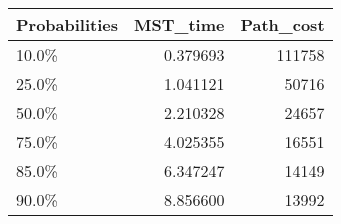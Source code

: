 \begin{tabular}{lrr}
\toprule
Probabilities &  MST\_time &  Path\_cost \\
\midrule
        10.0\% &  0.379693 &     111758 \\
        25.0\% &  1.041121 &      50716 \\
        50.0\% &  2.210328 &      24657 \\
        75.0\% &  4.025355 &      16551 \\
        85.0\% &  6.347247 &      14149 \\
        90.0\% &  8.856600 &      13992 \\
\bottomrule
\end{tabular}
